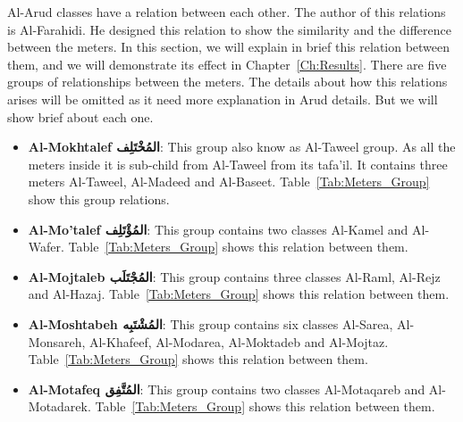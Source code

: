 Al-Arud classes have a relation between each other. The author of this relations is Al-Farahidi. He designed this relation to show the similarity and the difference between the meters. In this section, we will explain in brief this relation between them, and we will demonstrate its effect in Chapter~\ref{Ch:Results}. There are five groups of relationships between the meters. The details about how this relations arises will be omitted as it need more explanation in Arud details. But we will show brief about each one.
  \begin{itemize}
  \item \textbf{Al-Mokhtalef \textarabic{المُخْتَلِف}}: This group also know as Al-Taweel group. As all the meters inside it is sub-child from Al-Taweel from its tafa'il. It contains three meters Al-Taweel, Al-Madeed and Al-Baseet. Table~\ref{Tab:Meters_Group} show this group relations.
  \item \textbf{Al-Mo'talef \textarabic{المُؤْتَلِف}}: This group contains two classes Al-Kamel and Al-Wafer. Table~\ref{Tab:Meters_Group} shows this relation between them.%
  \item \textbf{Al-Mojtaleb \textarabic{المُجْتَلَب}}: This group contains three classes Al-Raml, Al-Rejz and Al-Hazaj. Table~\ref{Tab:Meters_Group} shows this relation between them.
  \item \textbf{Al-Moshtabeh \textarabic{المُشْتَبِه}}: This group contains six classes Al-Sarea, Al-Monsareh, Al-Khafeef, Al-Modarea, Al-Moktadeb and Al-Mojtaz. Table~\ref{Tab:Meters_Group} shows this relation between them.
  \item \textbf{Al-Motafeq \textarabic{المُتَّفِق}}: This group contains two classes Al-Motaqareb and Al-Motadarek. Table~\ref{Tab:Meters_Group} shows this relation between them.%


\end{itemize}

